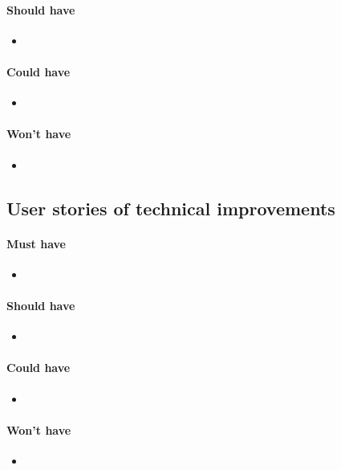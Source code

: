 \paragraph{Should have} 
\begin{itemize}
\item
\end{itemize}

\paragraph{Could have} 
\begin{itemize}
\item
\end{itemize}

\paragraph{Won't have} 
\begin{itemize}
\item
\end{itemize}

\subsection{User stories of technical improvements}
\paragraph{Must have} 
\begin{itemize}
\item 
\end{itemize}

\paragraph{Should have} 
\begin{itemize}
\item
\end{itemize}

\paragraph{Could have} 
\begin{itemize}
\item
\end{itemize}

\paragraph{Won't have} 
\begin{itemize}
\item
\end{itemize}


